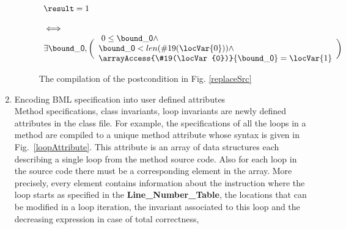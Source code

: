 \begin{enumerate}
\begin{figure}[t]
 $$\begin{array}{l}
         \result = 1 \\
          \\ 
         \iff \\ 
         \exists    \bound\_{\mbox{\rm \textsf{0}}}, 
           \biggl(\begin{array}{l} \ 0 \leq  \bound\_{\mbox{\rm \textsf{0}}} \wedge\\ 
             \bound\_{\mbox{\rm \textsf{0}}} < len(\#19(\locVar{0})) \wedge \\
             \arrayAccess{\#19(\locVar{0})}{\bound\_{\mbox{\rm \textsf{0}}} } = \locVar{1} 
         \end{array} \biggr) 
   \end{array}
$$
\caption{\sc The compilation of the postcondition in Fig. \ref{replaceSrc}}
\label{postCompile}
\end{figure}





\item Encoding BML specification  into user defined attributes\\
 Method specifications, class invariants, loop invariants are newly defined attributes in the class file.
 For example, the specifications of all the loops in a method are compiled to a unique method attribute whose syntax is
 given in Fig.~\ref{loopAttribute}. This attribute is an array of data structures each describing a single loop from the method source code.
 Also for each loop in the source code there must be a corresponding element in the array. 
More precisely, every element contains information about the instruction where the loop starts as specified in the
\textbf{Line\_Number\_Table}, the locations that can be modified in a loop iteration, 
 the invariant associated to this loop and the decreasing expression in case of total correctness, 
\end{enumerate}

